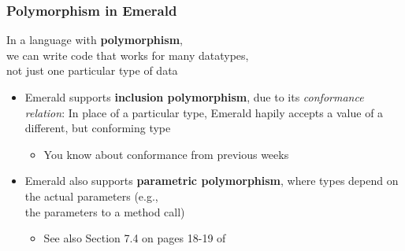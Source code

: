 \begin{frame}

\frametitle{Polymorphism in Emerald}

\begin{center}

In a language with \textbf{polymorphism},\\ we can write code that
works for many datatypes,\\ not just one particular type of data

\end{center}

\begin{itemize}

\item Emerald supports \textbf{inclusion polymorphism}, due to its
\emph{conformance relation}: In place of a particular type, Emerald
hapily accepts a value of a different, but conforming type

\begin{itemize}

\item You know about conformance from previous weeks

\end{itemize}

\item Emerald also supports \textbf{parametric polymorphism}, where
types depend on the actual parameters (e.g.,\\ the parameters to a
method call)

\begin{itemize}

\item See also Section 7.4 on pages 18-19 of \cite{report1991}

\end{itemize}

\end{itemize}

\end{frame}

